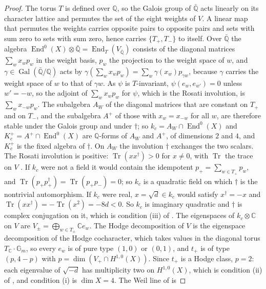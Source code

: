 \documentclass[11pt,reqno]{amsart}
\theoremstyle{plain}
\theoremstyle{definition}
\theoremstyle{remark}
\newcommand{\QQ}{\mathbb{Q}}
\newcommand{\CC}{\mathbb{C}}
\DeclareMathOperator{\End}{End}
\DeclareMathOperator{\Gal}{Gal}
\DeclareMathOperator{\Tr}{Tr}
\begin{document}
\begin{proof}
The torus $T$ is defined over $\QQ$, so the Galois group of $\bar{\QQ}$ acts
linearly on its character lattice and permutes the set of the eight weights
of $V$. A linear map that permutes the weights carries opposite pairs to
opposite pairs and sets with sum zero to sets with sum zero, hence carries
$\{T_{+},T_{-}\}$ to itself. Over $\bar{\QQ}$ the algebra
$\End^{0}(X)\otimes\bar{\QQ}=\End_{T}(V_{\bar{\QQ}})$ consists of the
diagonal matrices $\sum_{w}x_{w}p_{w}$ in the weight basis, $p_{w}$ the
projection to the weight space of $w$, and $\gamma\in\Gal(\bar{\QQ}/\QQ)$
acts by $\gamma(\sum_{w}x_{w}p_{w})=\sum_{w}\gamma(x_{w})p_{\gamma w}$,
because $\gamma$ carries the weight space of $w$ to that of $\gamma w$. As
$\psi$ is $T$-invariant, $\psi(e_{w},e_{w'})=0$ unless $w'=-w$, so the
adjoint of $\sum_{w}x_{w}p_{w}$ for $\psi$, which is the Rosati involution,
is $\sum_{w}x_{-w}p_{w}$. The subalgebra $A_{W}$ of the diagonal matrices
that are constant on $T_{+}$ and on $T_{-}$, and the subalgebra $A^{+}$ of
those with $x_{w}=x_{-w}$ for all $w$, are therefore stable under the Galois
group and under $\dagger$; so $k_{c}=A_{W}\cap\End^{0}(X)$ and
$K_{c}^{+}=A^{+}\cap\End^{0}(X)$ are $\QQ$-forms of $A_{W}$ and $A^{+}$, of
dimensions $2$ and $4$, and $K_{c}^{+}$ is the fixed algebra of $\dagger$.
On $A_{W}$ the involution $\dagger$ exchanges the two scalars. The Rosati
involution is positive: $\Tr(xx^{\dagger})>0$ for $x\ne0$, with $\Tr$ the
trace on $V$ \cite[Section~5.1]{BL04}. If $k_{c}$ were not a field it would
contain the idempotent $p_{+}=\sum_{w\in T_{+}}p_{w}$, and
$\Tr(p_{+}p_{+}^{\dagger})=\Tr(p_{+}p_{-})=0$; so $k_{c}$ is a quadratic
field on which $\dagger$ is the nontrivial automorphism. If $k_{c}$ were
real, $x=\sqrt{d}\in k_{c}$ would satisfy $x^{\dagger}=-x$ and
$\Tr(xx^{\dagger})=-\Tr(x^{2})=-8d<0$. So $k_{c}$ is imaginary quadratic and
$\dagger$ is complex conjugation on it, which is condition (iii) of
\cite[Definition~3.1]{paperI}. The eigenspaces of $k_{c}\otimes\CC$ on $V$ are
$V_{\pm}=\bigoplus_{w\in T_{\pm}}\CC e_{w}$. The Hodge decomposition of $V$
is the eigenspace decomposition of the Hodge cocharacter, which takes values
in the diagonal torus $T_{\CC}\cdot\mathbb{G}_{m}$, so every $e_{w}$ is of
pure type $(1,0)$ or $(0,1)$, and $t_{+}$ is of type $(p,4-p)$ with
$p=\dim(V_{+}\cap H^{1,0}(X))$. Since $t_{+}$ is a Hodge class, $p=2$: each
eigenvalue of $\sqrt{-d}$ has multiplicity two on $H^{1,0}(X)$, which is
condition (ii) of \cite[Definition~3.1]{paperI}, and condition (i) is $\dim X=4$. The
Weil line of \cite[Definition~3.6]{paperI} is

\end{proof}
\end{document}
